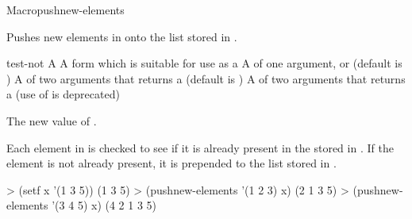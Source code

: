 \documentclass[10pt,twoside,english,pdftex]{article}
\begin{document}
\begin{functiondoc}{Macro}{pushnew-elements}{
      
    \returns{} } 
%
%
  
\fnsyntax

\fnpurpose Pushes new elements in  onto the list stored in
. 

\fnpackage {}

\fnmodule {}

\fnargs
\begin{args}{test-not}
\arg[list] A 
\arg[place] A form which is suitable for use as a
\arg[key] A  of one argument, or \nil{} (default is \nil)
\arg[test] A  of two arguments that returns a
 (default is ) 
 A  of two arguments that returns a
 (use of  is deprecated)
\end{args}

\fnreturns The new value of . 

\fndescription Each element in  is checked to see if it is
already present in the  stored in . If
the element is not already present, it is prepended to the list stored
in .

\fnexamples
%
\W\supp
\begin{example}
> (setf x '(1 3 5))
(1 3 5)
> (pushnew-elements '(1 2 3) x)
(2 1 3 5)
> (pushnew-elements '(3 4 5) x)
(4 2 1 3 5)
\end{example}

\end{functiondoc}

\end{document}
